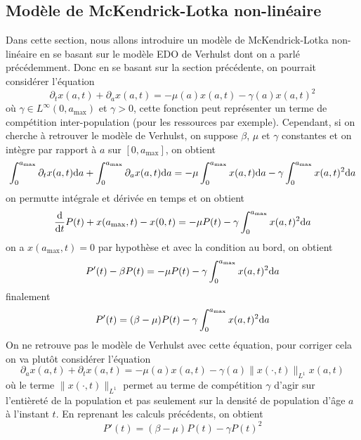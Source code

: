 \subsection{Modèle de McKendrick-Lotka non-linéaire}
Dans cette section, nous allons introduire un modèle de McKendrick-Lotka non-linéaire en se basant sur le modèle EDO de Verhulst dont on a parlé précédemment. Donc en se basant sur la section précédente, on pourrait considérer l'équation 
\begin{equation*}
    \partial_tx(a,t)+\partial_ax(a,t) = -\mu(a)x(a,t)-\gamma(a)x(a,t)^2
\end{equation*}
où $\gamma \in L^\infty(0,a_{\max})$ et $\gamma > 0$, cette fonction peut représenter un terme de compétition inter-population (pour les ressources par exemple). Cependant, si on cherche à retrouver le modèle de Verhulst, on suppose $\beta$, $\mu$ et $\gamma$ constantes et on intègre par rapport à $a$ sur $[0,a_{\max}]$, on obtient 
\begin{eqnarray*}
    \int_0^{a_{\max}}\partial_tx(a,t)\mathrm{d} a+\int_0^{a_{\max}}\partial_ax(a,t)\mathrm{d} a = -\mu \int_0^{a_{\max}}x(a,t)\mathrm{d} a-\gamma \int_0^{a_{\max}}x(a,t)^2\mathrm{d} a
\end{eqnarray*}
on permutte intégrale et dérivée en temps et on obtient 
\begin{equation*}
    \frac{\mathrm{d}}{\mathrm{d} t} P(t) + x(a_{\max},t)-x(0,t) = -\mu P(t) - \gamma \int_0^{a_{\max}}x(a,t)^2\mathrm{d} a
\end{equation*}
on a $x(a_{\max},t)=0$ par hypothèse et avec la condition au bord, on obtient
\begin{equation*}
    P'(t) -\beta P(t) = -\mu P(t) -\gamma\int_0^{a_{\max}}x(a,t)^2\mathrm{d} a
\end{equation*}
finalement
\begin{equation*}
    P'(t) = (\beta-\mu)P(t) - \gamma \int_0^{a_{\max}}x(a,t)^2\mathrm{d} a
\end{equation*}
On ne retrouve pas le modèle de Verhulst avec cette équation, pour corriger cela on va plutôt considérer l'équation 
\begin{equation*}
    \partial_a x(a,t) + \partial_t x(a,t) = -\mu(a)x(a,t)-\gamma(a)\|x(\cdot,t)\|_{L^1}x(a,t)
\end{equation*}
où le terme $\|x(\cdot,t)\|_{L^1}$ permet au terme de compétition $\gamma$ d'agir sur l'entièreté de la population et pas seulement sur la densité de population d'âge $a$ à l'instant $t$. En reprenant les calculs précédents, on obtient 
\begin{equation*}
    P'(t) = (\beta-\mu)P(t) - \gamma P(t)^2
\end{equation*}
